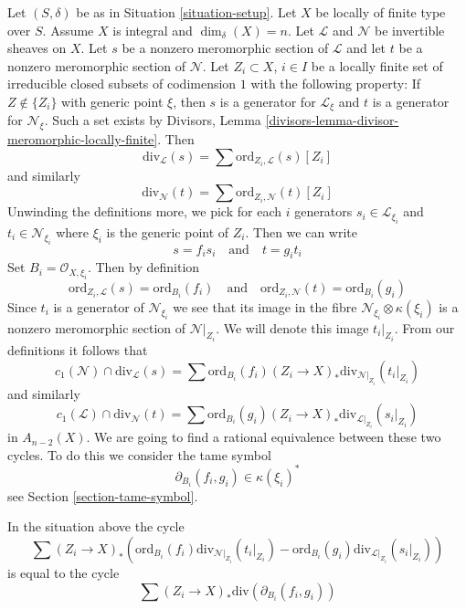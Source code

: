 \noindent
Let $(S, \delta)$ be as in Situation \ref{situation-setup}.
Let $X$ be locally of finite type over $S$. Assume
$X$ is integral and $\dim_\delta(X) = n$.
Let $\mathcal{L}$ and $\mathcal{N}$ be invertible sheaves on $X$.
Let $s$ be a nonzero meromorphic section of $\mathcal{L}$ and
let $t$ be a nonzero meromorphic section of $\mathcal{N}$.
Let $Z_i \subset X$, $i \in I$ be a locally finite set of irreducible
closed subsets of codimension $1$ with the following property:
If $Z \not \in \{Z_i\}$ with generic point $\xi$, then $s$ is a generator
for $\mathcal{L}_\xi$ and $t$ is a generator for $\mathcal{N}_\xi$.
Such a set exists by
Divisors, Lemma \ref{divisors-lemma-divisor-meromorphic-locally-finite}.
Then
$$
\text{div}_\mathcal{L}(s) = \sum \text{ord}_{Z_i, \mathcal{L}}(s) [Z_i]
$$
and similarly
$$
\text{div}_\mathcal{N}(t) = \sum \text{ord}_{Z_i, \mathcal{N}}(t) [Z_i]
$$
Unwinding the definitions more, we pick for each $i$ generators
$s_i \in \mathcal{L}_{\xi_i}$ and $t_i \in \mathcal{N}_{\xi_i}$
where $\xi_i$ is the generic point of $Z_i$. Then we can write
$$
s = f_i s_i
\quad\text{and}\quad
t = g_i t_i
$$
Set $B_i = \mathcal{O}_{X, \xi_i}$. Then by definition
$$
\text{ord}_{Z_i, \mathcal{L}}(s) = \text{ord}_{B_i}(f_i)
\quad\text{and}\quad
\text{ord}_{Z_i, \mathcal{N}}(t) = \text{ord}_{B_i}(g_i)
$$
Since $t_i$ is a generator of $\mathcal{N}_{\xi_i}$ we see that
its image in the fibre $\mathcal{N}_{\xi_i} \otimes \kappa(\xi_i)$
is a nonzero meromorphic section of $\mathcal{N}|_{Z_i}$. We will denote
this image $t_i|_{Z_i}$. From our definitions it follows that
$$
c_1(\mathcal{N}) \cap \text{div}_\mathcal{L}(s) =
\sum \text{ord}_{B_i}(f_i)
(Z_i \to X)_*\text{div}_{\mathcal{N}|_{Z_i}}(t_i|_{Z_i})
$$
and similarly
$$
c_1(\mathcal{L}) \cap \text{div}_\mathcal{N}(t) =
\sum \text{ord}_{B_i}(g_i)
(Z_i \to X)_*\text{div}_{\mathcal{L}|_{Z_i}}(s_i|_{Z_i})
$$
in $A_{n - 2}(X)$. We are going to find a rational equivalence between
these two cycles. To do this we consider the tame symbol
$$
\partial_{B_i}(f_i, g_i) \in \kappa(\xi_i)^*
$$
see Section \ref{section-tame-symbol}.

\begin{lemma}
\label{lemma-key-formula}
In the situation above the cycle
$$
\sum
(Z_i \to X)_*\left(
\text{ord}_{B_i}(f_i) \text{div}_{\mathcal{N}|_{Z_i}}(t_i|_{Z_i}) -
\text{ord}_{B_i}(g_i) \text{div}_{\mathcal{L}|_{Z_i}}(s_i|_{Z_i}) \right)
$$
is equal to the cycle
$$
\sum (Z_i \to X)_*\text{div}(\partial_{B_i}(f_i, g_i))
$$
\end{lemma}

